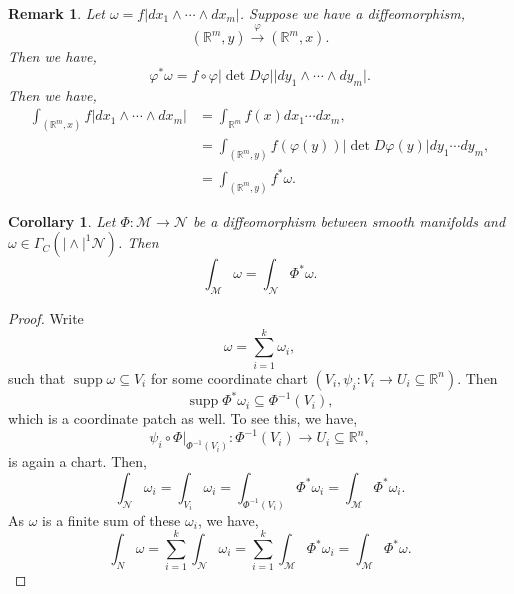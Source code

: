 \documentclass[8pt]{article}
\newtheorem{remark}{Remark}[section]
\newtheorem{corollary}{Corollary} [section]
\DeclareMathOperator{\supp}{supp}
\newcommand{\R}[0]{\mathbb{R}}
\newcommand{\M}[0]{\mathcal{M}}
\newcommand{\maniN}[0]{\mathcal{N}}
\begin{document}

\begin{remark}
  Let $\omega = f\vert dx_1\wedge\cdots\wedge dx_m\vert$. Suppose we have a diffeomorphism,
  \begin{equation*}
    (\R^m,y)\stackrel{\varphi}{\to}(\R^m,x).
  \end{equation*}
  Then we have,
  \begin{equation*}
    \varphi^*\omega = f\circ\varphi\vert\det D\varphi\vert\vert dy_1\wedge\cdots\wedge dy_m\vert.
  \end{equation*}
  Then we have,
  \begin{align*}
    \int_{(\R^m,x)}f\vert dx_1\wedge\cdots\wedge dx_m\vert & = \int_{\R^m}f(x)dx_1\cdots dx_m,\\
    & = \int_{(\R^m,y)}f(\varphi(y))\vert \det D\varphi(y)\vert dy_1\cdots dy_m,\\
    & = \int_{(\R^m,y)}f^*\omega.
  \end{align*}
\end{remark}

\begin{corollary}
  Let $\Phi:\M\to\maniN$ be a diffeomorphism between smooth manifolds and $\omega\in\Gamma_C(\vert\wedge\vert^1\maniN)$. Then 
  \begin{equation*}
    \int_\M\omega = \int_\maniN\Phi^*\omega.
  \end{equation*}
\end{corollary}

\begin{proof}
  Write 
  \begin{equation*}
    \omega = \sum_{i=1}^k \omega_i,
  \end{equation*}
  such that $\supp\omega\subseteq V_i$ for some coordinate chart $(V_i,\psi_i:V_i\to U_i\subseteq\R^n)$. Then 
  \begin{equation*}
    \supp\Phi^*\omega_i\subseteq\Phi^{-1}(V_i),
  \end{equation*} 
  which is a coordinate patch as well. To see this, we have,
  \begin{equation*}
    \psi_i\circ\Phi|_{\Phi^{-1}(V_i)}:\Phi^{-1}(V_i)\to U_i\subseteq\R^n,
  \end{equation*}
  is again a chart. Then,
  \begin{equation*}
    \int_{\maniN}\omega_i = \int_{V_i}\omega_i = \int_{\Phi^{-1}(V_i)}\Phi^*\omega_i = \int_\M\Phi^*\omega_i.
  \end{equation*}
  As $\omega$ is a finite sum of these $\omega_i$, we have,
  \begin{equation*}
    \int_N\omega = \sum_{i=1}^k \int_\maniN\omega_i = \sum_{i=1}^k \int_\M\Phi^*\omega_i = \int_\M\Phi^*\omega.
  \end{equation*}
\end{proof}
\end{document}
